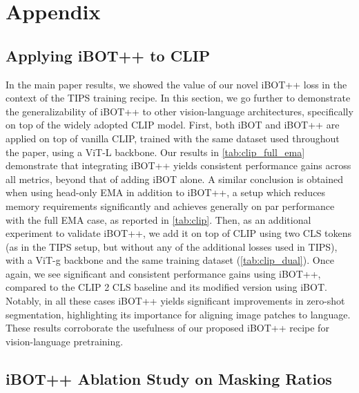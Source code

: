 \appendix
\section{Appendix}







\subsection{Applying iBOT++ to CLIP}


In the main paper results, we showed the value of our novel iBOT++ loss in the context of the TIPS training recipe.
In this section, we go further to demonstrate the generalizability of iBOT++ to other vision-language architectures, specifically on top of the widely adopted CLIP model.
First, both iBOT and iBOT++ are applied on top of vanilla CLIP, trained with the same dataset used throughout the paper, using a ViT-L backbone.
Our results in \cref{tab:clip_full_ema} demonstrate that integrating iBOT++ yields consistent performance gains across all metrics, beyond that of adding iBOT alone.
A similar conclusion is obtained when using head-only EMA in addition to iBOT++, a setup which reduces memory requirements significantly and achieves generally on par performance with the full EMA case, as reported in \cref{tab:clip}.
Then, as an additional experiment to validate iBOT++, we add it on top of CLIP using two CLS tokens (as in the TIPS setup, but without any of the additional losses used in TIPS), with a ViT-g backbone and the same training dataset (\cref{tab:clip_dual}).
Once again, we see significant and consistent performance gains using iBOT++, compared to the CLIP 2 CLS baseline and its modified version using iBOT.
Notably, in all these cases iBOT++ yields significant improvements in zero-shot segmentation, highlighting its importance for aligning image patches to language.
These results corroborate the usefulness of our proposed iBOT++ recipe for vision-language pretraining.

\subsection{iBOT++ Ablation Study on Masking Ratios}



